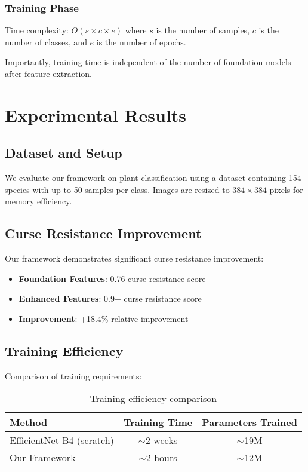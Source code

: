 \documentclass[11pt,a4paper]{article}
\begin{document}
\subsubsection{Training Phase}  
Time complexity: $O(s \times c \times e)$ where $s$ is the number of samples, $c$ is the number of classes, and $e$ is the number of epochs.

Importantly, training time is independent of the number of foundation models after feature extraction.

\section{Experimental Results}

\subsection{Dataset and Setup}

We evaluate our framework on plant classification using a dataset containing 154 species with up to 50 samples per class. Images are resized to $384 \times 384$ pixels for memory efficiency.

\subsection{Curse Resistance Improvement}

Our framework demonstrates significant curse resistance improvement:

\begin{itemize}
    \item \textbf{Foundation Features}: 0.76 curse resistance score
    \item \textbf{Enhanced Features}: 0.9+ curse resistance score
    \item \textbf{Improvement}: +18.4\% relative improvement
\end{itemize}

\subsection{Training Efficiency}

Comparison of training requirements:

\begin{table}[ht]
\centering
\begin{tabular}{lcc}
\toprule
Method & Training Time & Parameters Trained \\
\midrule
EfficientNet B4 (scratch) & $\sim$2 weeks & $\sim$19M \\
Our Framework & $\sim$2 hours & $\sim$12M \\
\bottomrule
\end{tabular}
\caption{Training efficiency comparison}
\end{table}
\end{document}

